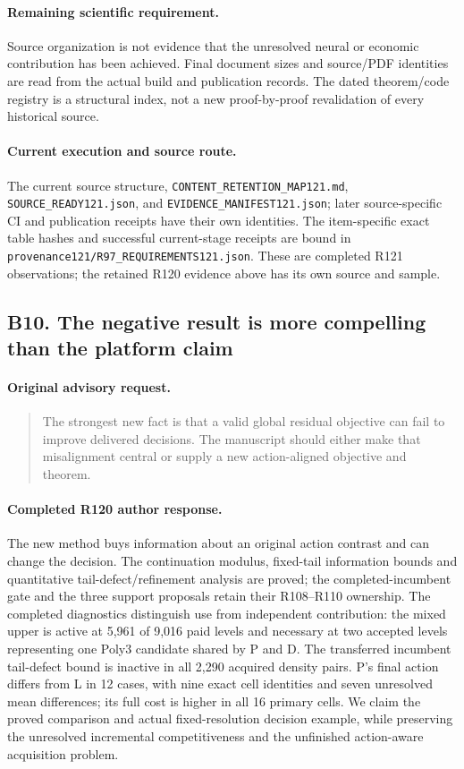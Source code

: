 \paragraph{Remaining scientific requirement.}
Source organization is not evidence that the unresolved neural or economic contribution has been achieved. Final document sizes and source/PDF identities are read from the actual build and publication records. The dated theorem/code registry is a structural index, not a new proof-by-proof revalidation of every historical source.

\paragraph{Current execution and source route.}
The current source structure, \nolinkurl{CONTENT_RETENTION_MAP121.md}, \nolinkurl{SOURCE_READY121.json}, and \nolinkurl{EVIDENCE_MANIFEST121.json}; later source-specific CI and publication receipts have their own identities.
The item-specific exact table hashes and successful current-stage receipts are bound in \nolinkurl{provenance121/R97_REQUIREMENTS121.json}. These are completed R121 observations; the retained R120 evidence above has its own source and sample.

\subsection{B10. The negative result is more compelling than the platform claim}
\label{response121:B10}

\paragraph{Original advisory request.}
\begin{quote}
The strongest new fact is that a valid global residual objective can fail to improve delivered decisions. The manuscript should either make that misalignment central or supply a new action-aligned objective and theorem.
\end{quote}

\paragraph{Completed R120 author response.}
The new method buys information about an original action contrast and can change the decision. The continuation modulus, fixed-tail information bounds and quantitative tail-defect/refinement analysis are proved; the completed-incumbent gate and the three support proposals retain their R108--R110 ownership. The completed diagnostics distinguish use from independent contribution: the mixed upper is active at 5,961 of 9,016 paid levels and necessary at two accepted levels representing one Poly3 candidate shared by P and D. The transferred incumbent tail-defect bound is inactive in all 2,290 acquired density pairs. P's final action differs from L in 12 cases, with nine exact cell identities and seven unresolved mean differences; its full cost is higher in all 16 primary cells. We claim the proved comparison and actual fixed-resolution decision example, while preserving the unresolved incremental competitiveness and the unfinished action-aware acquisition problem.

